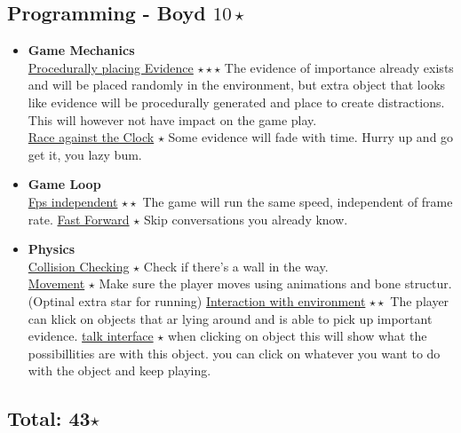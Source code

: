 \documentclass{article}
\begin{document}
		\subsection{Programming - Boyd $10 \star$}
			\begin{itemize}
				\item \textbf{Game Mechanics}\\
					\underline{Procedurally placing Evidence} $\star \star \star$ The evidence of importance already exists and will be placed randomly in the environment, but extra object that looks like evidence will be procedurally generated and place to create distractions. This will however not have impact on the game play.\\
					\underline{Race against the Clock} $\star$ Some evidence will fade with time. Hurry up and go get it, you lazy bum.
				\item \textbf{Game Loop}\\
					\underline{Fps independent} $\star \star$ The game will run the same speed, independent of frame rate.
					\underline{Fast Forward} $\star$ Skip conversations you already know.
				\item \textbf{Physics}\\
					\underline{Collision Checking} $\star$ Check if there's a wall in the way.\\
					\underline{Movement} $\star$ Make sure the player moves using animations and bone structur. (Optinal extra star for running)
					\underline{Interaction with environment} $\star \star$ The player can klick on objects that ar lying around and is able to pick up important evidence.
					\underline{talk interface} $\star$ when clicking on object this will show what the possibillities are with this object. you can click on whatever you want to do with the object and keep playing.
			\end{itemize}

			\subsection*{Total: 43$\star$}

			
\end{document}
